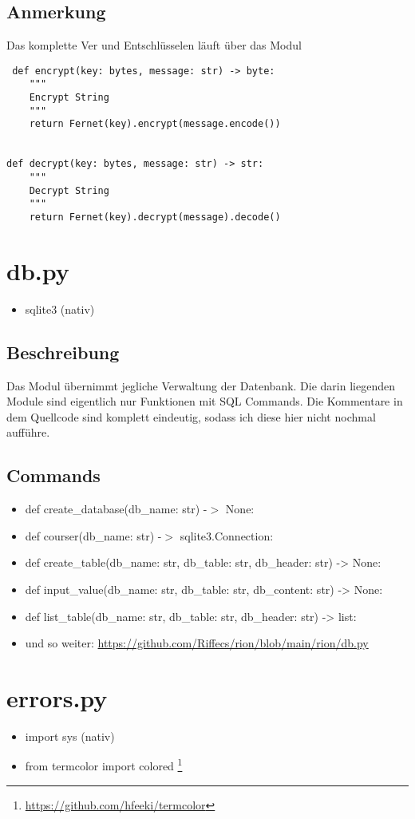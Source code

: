 \documentclass[fleqn,10pt]{olplainarticle}
\begin{document}
\subsection{Anmerkung}
Das komplette Ver und Entschlüsselen läuft über das Modul
\begin{lstlisting}
 def encrypt(key: bytes, message: str) -> byte:
    """
    Encrypt String
    """
    return Fernet(key).encrypt(message.encode())


def decrypt(key: bytes, message: str) -> str:
    """
    Decrypt String
    """
    return Fernet(key).decrypt(message).decode()

\end{lstlisting}



\section{db.py}
\begin{itemize}
    \item sqlite3 (nativ)
\end{itemize}
\subsection{Beschreibung}
Das Modul übernimmt jegliche Verwaltung der Datenbank. Die darin liegenden Module sind eigentlich nur Funktionen mit SQL Commands. Die Kommentare in dem Quellcode sind komplett eindeutig, sodass ich diese hier nicht nochmal aufführe. 
\subsection{Commands}
\begin{itemize}
    \item def create\_database(db\_name: str) -$>$ None:
    \item def courser(db\_name: str) -$>$ sqlite3.Connection:
    \item def create\_table(db\_name: str, db\_table: str, db\_header: str) -> None:
    \item def input\_value(db\_name: str, db\_table: str, db\_content: str) -> None:
    \item def list\_table(db\_name: str, db\_table: str, db\_header: str) -> list:
    \item und so weiter: \url{https://github.com/Riffecs/rion/blob/main/rion/db.py}
\end{itemize}

\section{errors.py}
\begin{itemize}
    \item import sys (nativ)
    \item from termcolor import colored \footnote{\url{https://github.com/hfeeki/termcolor}}
\end{itemize}
\end{document}

